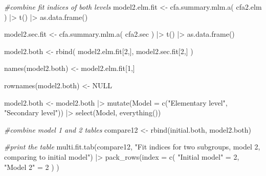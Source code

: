\documentclass[
]{article}
\newenvironment{Shaded}{\begin{snugshade}}{\end{snugshade}}
\newcommand{\AttributeTok}[1]{\textcolor[rgb]{0.77,0.63,0.00}{#1}}
\newcommand{\CommentTok}[1]{\textcolor[rgb]{0.56,0.35,0.01}{\textit{#1}}}
\newcommand{\ConstantTok}[1]{\textcolor[rgb]{0.00,0.00,0.00}{#1}}
\newcommand{\DecValTok}[1]{\textcolor[rgb]{0.00,0.00,0.81}{#1}}
\newcommand{\FunctionTok}[1]{\textcolor[rgb]{0.00,0.00,0.00}{#1}}
\newcommand{\NormalTok}[1]{#1}
\newcommand{\OtherTok}[1]{\textcolor[rgb]{0.56,0.35,0.01}{#1}}
\newcommand{\SpecialCharTok}[1]{\textcolor[rgb]{0.00,0.00,0.00}{#1}}
\newcommand{\StringTok}[1]{\textcolor[rgb]{0.31,0.60,0.02}{#1}}
\begin{document}
\begin{Shaded}
\begin{Highlighting}[]
\CommentTok{\#combine fit indices of both levels}
\NormalTok{model2.elm.fit }\OtherTok{\textless{}{-}} 
  \FunctionTok{cfa.summary.mlm.a}\NormalTok{(}
\NormalTok{    cfa2.elm}
\NormalTok{    ) }\SpecialCharTok{|\textgreater{}} 
  \FunctionTok{t}\NormalTok{() }\SpecialCharTok{|\textgreater{}} 
  \FunctionTok{as.data.frame}\NormalTok{()}

\NormalTok{model2.sec.fit }\OtherTok{\textless{}{-}} 
  \FunctionTok{cfa.summary.mlm.a}\NormalTok{(}
\NormalTok{    cfa2.sec}
\NormalTok{    ) }\SpecialCharTok{|\textgreater{}} 
  \FunctionTok{t}\NormalTok{() }\SpecialCharTok{|\textgreater{}} 
  \FunctionTok{as.data.frame}\NormalTok{()}

\NormalTok{model2.both }\OtherTok{\textless{}{-}} 
  \FunctionTok{rbind}\NormalTok{(}
\NormalTok{    model2.elm.fit[}\DecValTok{2}\NormalTok{,], }
\NormalTok{    model2.sec.fit[}\DecValTok{2}\NormalTok{,]}
\NormalTok{    ) }

\FunctionTok{names}\NormalTok{(model2.both) }\OtherTok{\textless{}{-}}\NormalTok{ model2.elm.fit[}\DecValTok{1}\NormalTok{,]}

\FunctionTok{rownames}\NormalTok{(model2.both) }\OtherTok{\textless{}{-}} \ConstantTok{NULL}

\NormalTok{model2.both }\OtherTok{\textless{}{-}} 
\NormalTok{  model2.both }\SpecialCharTok{|\textgreater{}} 
  \FunctionTok{mutate}\NormalTok{(}\AttributeTok{Model =} \FunctionTok{c}\NormalTok{(}\StringTok{"Elementary level"}\NormalTok{,}
    \StringTok{"Secondary level"}\NormalTok{)) }\SpecialCharTok{|\textgreater{}} 
  \FunctionTok{select}\NormalTok{(Model, }\FunctionTok{everything}\NormalTok{())}

\CommentTok{\#combine model 1 and 2 tables}
\NormalTok{compare12 }\OtherTok{\textless{}{-}} \FunctionTok{rbind}\NormalTok{(initial.both, model2.both)}

\CommentTok{\#print the table}
\FunctionTok{multi.fit.tab}\NormalTok{(compare12, }
              \StringTok{"Fit indices for two subgroups, model 2, comparing to initial model"}\NormalTok{) }\SpecialCharTok{|\textgreater{}} 
  \FunctionTok{pack\_rows}\NormalTok{(}\AttributeTok{index =} \FunctionTok{c}\NormalTok{(}
    \StringTok{"Initial model"} \OtherTok{=} \DecValTok{2}\NormalTok{,}
    \StringTok{"Model 2"} \OtherTok{=} \DecValTok{2}
\NormalTok{  )}
\NormalTok{  )}
\end{Highlighting}
\end{Shaded}
\end{document}
